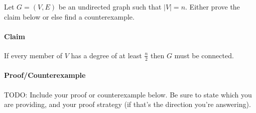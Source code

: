 


Let $G=(V,E)$ be an undirected graph such that $|V|=n$. Either prove the claim below or else find a counterexample.
\paragraph{Claim} If every member of $V$ has a degree of at least $\frac{n}{2}$ then $G$ must be connected.


\paragraph{Proof/Counterexample} TODO: Include your proof or counterexample below. Be sure to state which you are providing, and your proof strategy (if that's the direction you're answering).